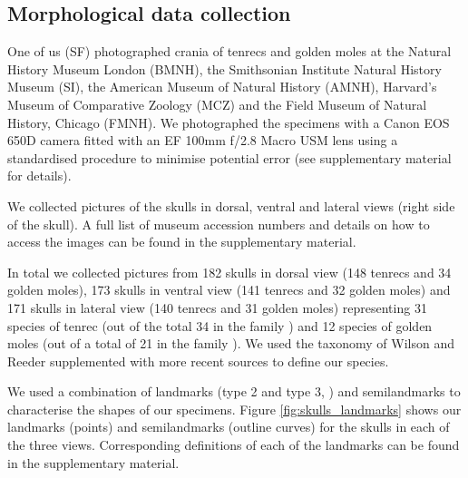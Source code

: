 \documentclass[12pt,a4paper]{article}
\begin{document}
	

\subsection{Morphological data collection} %
	
	One of us (SF) photographed crania of tenrecs and golden moles at the Natural History Museum London (BMNH), the Smithsonian Institute Natural History Museum (SI), the American Museum of Natural History (AMNH), Harvard's Museum of Comparative Zoology (MCZ) and the Field Museum of Natural History, Chicago (FMNH). We photographed the specimens with a Canon EOS 650D camera fitted with an EF 100mm f/2.8 Macro USM lens using a standardised procedure to minimise potential error (see supplementary material for details). 

	We collected pictures of the skulls in dorsal, ventral and lateral views (right side of the skull). A full list of museum accession numbers and details on how to access the images can be found in the supplementary material.
	
	

	In total we collected pictures from 182 skulls in dorsal view (148 tenrecs and 34 golden moles), 173 skulls in ventral view (141 tenrecs and 32 golden moles) and 171 skulls in lateral view (140 tenrecs and 31 golden moles) representing 31 species of tenrec (out of the total 34 in the family \citep{Olson2013}) and 12 species of golden moles (out of a total of 21 in the family \citep{Asher2010}). We used the taxonomy of Wilson and Reeder \citeyearpar{Wilson2005} supplemented with more recent sources \citep{Olson2013} to define our species. 
	

	We used a combination of landmarks (type 2 and type 3, \citep{Zelditch2012}) and semilandmarks to characterise the shapes of our specimens. Figure \ref{fig:skulls_landmarks} shows our landmarks (points) and semilandmarks (outline curves) for the skulls in each of the three views. Corresponding definitions of each of the landmarks can be found in the supplementary material.
	
\end{document}
